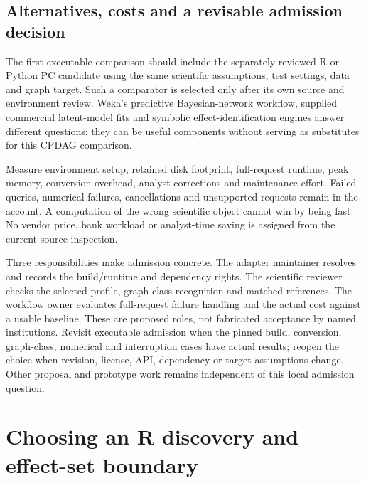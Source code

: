 \hypertarget{alternatives-costs-and-a-revisable-admission-decision}{%
\subsection{Alternatives, costs and a revisable admission
decision}\label{alternatives-costs-and-a-revisable-admission-decision}}

The first executable comparison should include the separately reviewed R
or Python PC candidate using the same scientific assumptions, test
settings, data and graph target. Such a comparator is selected only
after its own source and environment review. Weka's predictive
Bayesian-network workflow, supplied commercial latent-model fits and
symbolic effect-identification engines answer different questions; they
can be useful components without serving as substitutes for this CPDAG
comparison. \citep{exec13_java_tetrad,exec13_tetrad_reuse_decision}

Measure environment setup, retained disk footprint, full-request
runtime, peak memory, conversion overhead, analyst corrections and
maintenance effort. Failed queries, numerical failures, cancellations
and unsupported requests remain in the account. A computation of the
wrong scientific object cannot win by being fast. No vendor price, bank
workload or analyst-time saving is assigned from the current source
inspection.

Three responsibilities make admission concrete. The adapter maintainer
resolves and records the build/runtime and dependency rights. The
scientific reviewer checks the selected profile, graph-class recognition
and matched references. The workflow owner evaluates full-request
failure handling and the actual cost against a usable baseline. These
are proposed roles, not fabricated acceptance by named institutions.
Revisit executable admission when the pinned build, conversion,
graph-class, numerical and interruption cases have actual results;
reopen the choice when revision, license, API, dependency or target
assumptions change. Other proposal and prototype work remains
independent of this local admission question.
\citep{exec13_tetrad_reuse_decision} \label{exec13:tetrad-reuse-end}


\hypertarget{choosing-an-r-discovery-and-effect-set-boundary}{%
\section{Choosing an R discovery and effect-set
boundary}\label{choosing-an-r-discovery-and-effect-set-boundary}}

